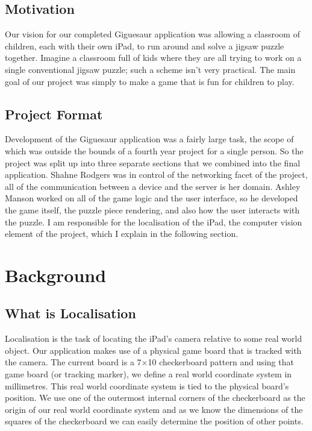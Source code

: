 \documentclass{article}
\begin{document}
\subsection{Motivation}

Our vision for our completed Giguesaur application was allowing a classroom of children, each with their own iPad, to run around and solve a jigsaw puzzle together. Imagine a classroom full of kids where they are all trying to work on a single conventional jigsaw puzzle; such a scheme isn't very practical. The main goal of our project was simply to make a game that is fun for children to play. 


\subsection{Project Format}

Development of the Giguesaur application was a fairly large task, the scope of which was outside the bounds of a fourth year project for a single person. So the project was split up into three separate sections that we combined into the final application. Shahne Rodgers was in control of the networking facet of the project, all of the communication between a device and the server is her domain. Ashley Manson worked on all of the game logic and the user interface, so he developed the game itself, the puzzle piece rendering, and also how the user interacts with the puzzle. I am responsible for the localisation of the iPad, the computer vision element of the project, which I explain in the following section. 


\section{Background}
\subsection{What is Localisation}

Localisation is the task of locating the iPad's camera relative to some real world object. Our application makes use of a physical game board that is tracked with the camera. The current board is a 7$\times$10 checkerboard pattern and using that game board (or tracking marker), we define a real world coordinate system in millimetres. This real world coordinate system is tied to the physical board's position. We use one of the outermost internal corners of the checkerboard as the origin of our real world coordinate system and as we know the dimensions of the squares of the checkerboard we can easily determine the position of other points. \par
\end{document}

